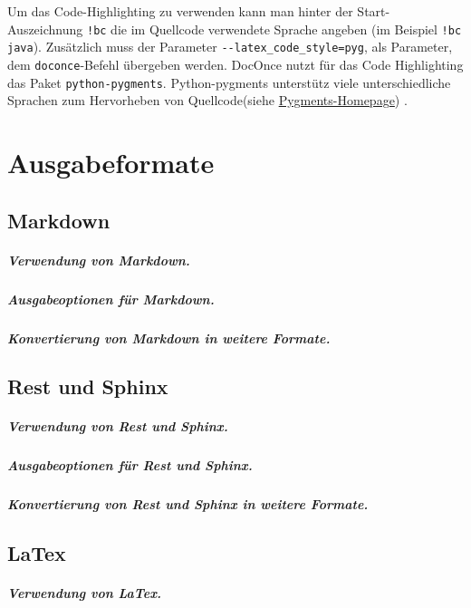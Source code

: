 \documentclass[%
oneside,                 %
final,                   %
chapterprefix=true,      %
open=right,              %
10pt]{book}
\begin{document}
Um das Code-Highlighting zu verwenden kann man hinter der Start-Auszeichnung \Verb?!bc? die im Quellcode verwendete Sprache angeben (im Beispiel \Verb?!bc java?). Zusätzlich muss der Parameter \Verb!--latex_code_style=pyg!, als Parameter, dem \texttt{doconce}-Befehl übergeben werden. DocOnce nutzt für das Code Highlighting das Paket \texttt{python-pygments}. Python-pygments unterstütz viele unterschiedliche Sprachen zum Hervorheben von Quellcode(siehe \href{{http://pygments.org/docs/cmdline/#getting-lexer-names}}{Pygments-Homepage}) .
\chapter{Ausgabeformate}

\section{Markdown}
\paragraph{ Verwendung von Markdown.}
\paragraph{ Ausgabeoptionen für Markdown.}
\paragraph{ Konvertierung von Markdown in weitere Formate.}
\section{Rest und Sphinx}
\paragraph{ Verwendung von Rest und Sphinx.}
\paragraph{ Ausgabeoptionen für Rest und Sphinx.}
\paragraph{ Konvertierung von Rest und Sphinx in weitere Formate.}
\section{LaTex}
\paragraph{ Verwendung von LaTex.}
\end{document}

